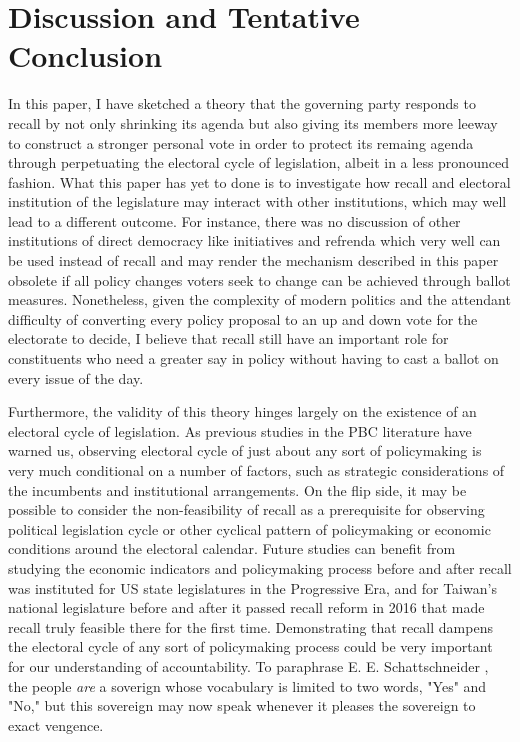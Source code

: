 \documentclass{article}
\begin{document}
	\section*{Discussion and Tentative Conclusion}
		In this paper, I have sketched a theory that
		the governing party responds to recall by
		not only shrinking its agenda
		but also giving its members more leeway to construct a stronger personal vote
		in order to protect its remaing agenda
		through perpetuating
		the electoral cycle of legislation,
		albeit in a less pronounced fashion.
		What this paper has yet to done
		is to investigate how recall and electoral institution of the legislature
		may interact with other institutions,
		which may well lead to a different outcome.
		For instance,
		there was no discussion of other institutions of direct democracy
		like initiatives and refrenda
		which very well can be used instead of recall
		and may render the mechanism described in this paper obsolete
		if all policy changes voters seek to change can be achieved through ballot measures.
		Nonetheless,
		given the complexity of modern politics
		and the attendant difficulty of converting every policy proposal to
		an up and down vote for the electorate to decide,
		I believe that recall still have an important role for
		constituents who need a greater say in policy
		without having to cast a ballot on every issue of the day.
		
		Furthermore,
		the validity of this theory hinges largely on
		the existence of an electoral cycle of legislation.
		As previous studies in the PBC literature have warned us,
		observing electoral cycle of just about any sort of policymaking
		is very much conditional on a number of factors,
		such as strategic considerations of the incumbents
		and institutional arrangements.
		On the flip side,
		it may be possible to consider the non-feasibility of recall
		as a prerequisite for observing political legislation cycle
		or other cyclical pattern of policymaking or economic conditions
		around the electoral calendar.
		Future studies can benefit from studying
		the economic indicators and policymaking process
		before and after recall was instituted for US state legislatures
		in the Progressive Era,
		and for Taiwan's national legislature
		before and after it passed recall reform in 2016
		that made recall truly feasible there for the first time.
		Demonstrating that recall dampens the electoral cycle
		of any sort of policymaking process
		could be very important for our understanding of accountability.
		To paraphrase E. E. Schattschneider \autocite*[52]{schattschneiderPartyGovernmentAmerican2017},
		the people \textit{are} a soverign
		whose vocabulary is limited to two words, "Yes"
		and "No," but this sovereign may now speak
		whenever it pleases the sovereign to exact vengence.
		
		
		
		
		
	
	\newpage
	\printbibliography
			
\end{document}

